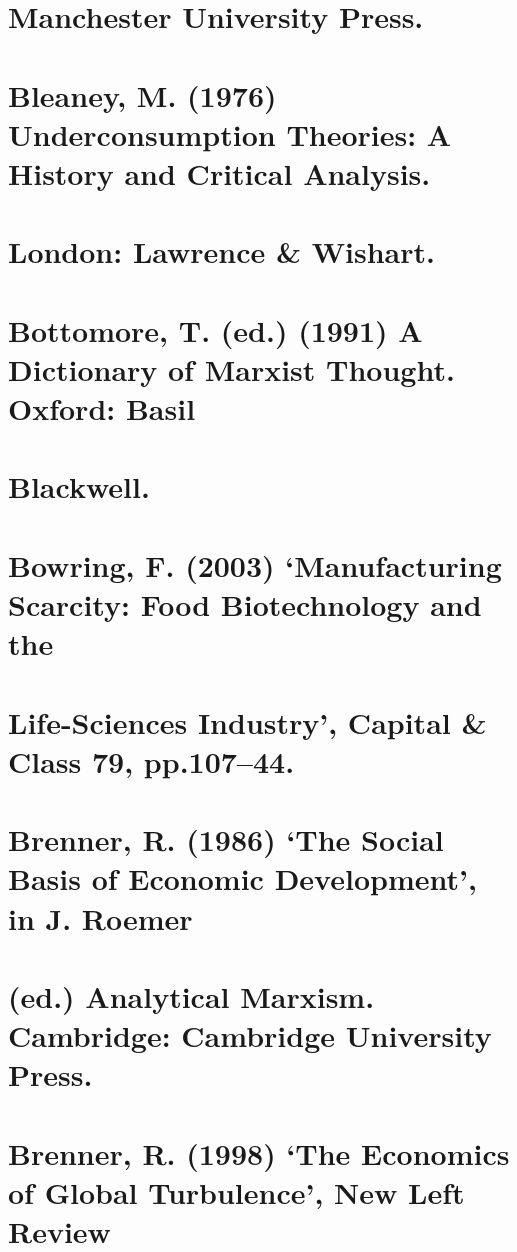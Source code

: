 \section{Manchester University Press.}


\section{Bleaney, M. (1976) Underconsumption Theories: A History and Critical Analysis.}


\section{London: Lawrence & Wishart.}


\section{Bottomore, T. (ed.) (1991) A Dictionary of Marxist Thought. Oxford: Basil}


\section{Blackwell.}


\section{Bowring, F. (2003) ‘Manufacturing Scarcity: Food Biotechnology and the}


\section{Life-Sciences Industry’, Capital & Class 79, pp.107–44.}


\section{Brenner, R. (1986) ‘The Social Basis of Economic Development’, in J. Roemer}


\section{(ed.) Analytical Marxism. Cambridge: Cambridge University Press.}


\section{Brenner, R. (1998) ‘The Economics of Global Turbulence’, New Left Review}


